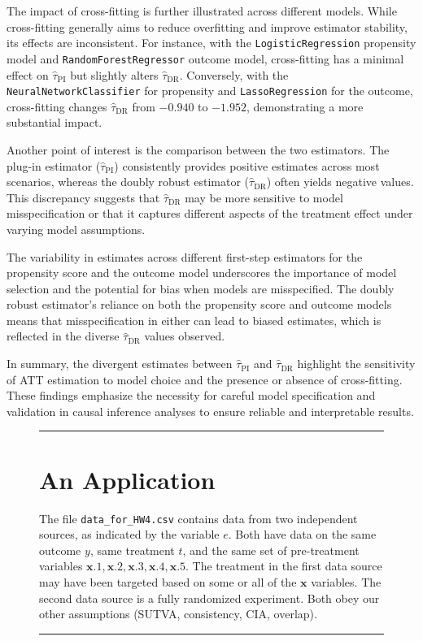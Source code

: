 \documentclass{article}
\newenvironment{colorparagraph}[1]{\par\color{#1}}{\par}
\begin{document}
The impact of cross-fitting is further illustrated across different models. While cross-fitting generally aims to reduce overfitting and improve estimator stability, its effects are inconsistent. For instance, with the \texttt{LogisticRegression} propensity model and \texttt{RandomForestRegressor} outcome model, cross-fitting has a minimal effect on $\hat{\tau}_{\text{PI}}$ but slightly alters $\hat{\tau}_{\text{DR}}$. Conversely, with the \texttt{NeuralNetworkClassifier} for propensity and \texttt{LassoRegression} for the outcome, cross-fitting changes $\hat{\tau}_{\text{DR}}$ from $-0.940$ to $-1.952$, demonstrating a more substantial impact.

Another point of interest is the comparison between the two estimators. The plug-in estimator ($\hat{\tau}_{\text{PI}}$) consistently provides positive estimates across most scenarios, whereas the doubly robust estimator ($\hat{\tau}_{\text{DR}}$) often yields negative values. This discrepancy suggests that $\hat{\tau}_{\text{DR}}$ may be more sensitive to model misspecification or that it captures different aspects of the treatment effect under varying model assumptions.

The variability in estimates across different first-step estimators for the propensity score and the outcome model underscores the importance of model selection and the potential for bias when models are misspecified. The doubly robust estimator's reliance on both the propensity score and outcome models means that misspecification in either can lead to biased estimates, which is reflected in the diverse $\hat{\tau}_{\text{DR}}$ values observed.

In summary, the divergent estimates between $\hat{\tau}_{\text{PI}}$ and $\hat{\tau}_{\text{DR}}$ highlight the sensitivity of ATT estimation to model choice and the presence or absence of cross-fitting. These findings emphasize the necessity for careful model specification and validation in causal inference analyses to ensure reliable and interpretable results.

\begin{figure}[H]
  \begin{colorparagraph}{questioncolor}
  \rule{\textwidth}{0.5pt}
  \label{q3}
  \section{An Application}

  The file \texttt{data\_for\_HW4.csv} contains data from two independent sources, as indicated by the variable \( e \). Both have data on the same outcome \( y \), same treatment \( t \), and the same set of pre-treatment variables \( \mathbf{x}.1, \mathbf{x}.2, \mathbf{x}.3, \mathbf{x}.4, \mathbf{x}.5 \). The treatment in the first data source may have been targeted based on some or all of the \( \mathbf{x} \) variables. The second data source is a fully randomized experiment. Both obey our other assumptions (SUTVA, consistency, CIA, overlap).

  \rule{\textwidth}{0.5pt}
  \end{colorparagraph}
\end{figure}
\end{document}
